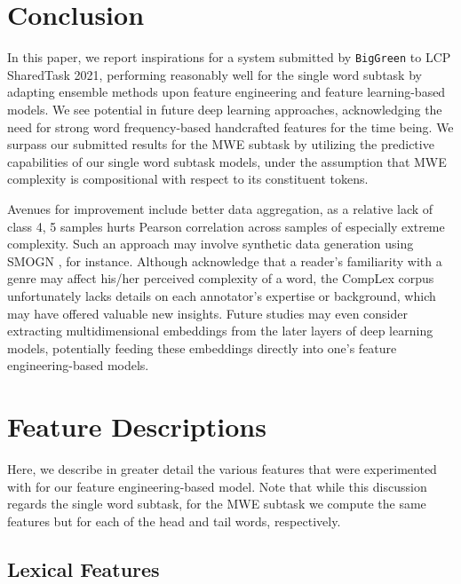 \documentclass{dcthesis}
\theoremstyle{definition}
\theoremstyle{remark}
\begin{document}
\chapter{Conclusion}

In this paper, we report inspirations for a system submitted by \texttt{BigGreen} to LCP SharedTask 2021, performing reasonably well for the single word subtask by adapting ensemble methods upon feature engineering and feature learning-based models. We see potential in future deep learning approaches, acknowledging the need for strong word frequency-based handcrafted features for the time being. We surpass our submitted results for the MWE subtask by utilizing the predictive capabilities of our single word subtask models, under the assumption that MWE complexity is compositional with respect to its constituent tokens.

Avenues for improvement include better data aggregation, as a relative lack of class 4, 5 samples hurts Pearson correlation across samples of especially extreme complexity. Such an approach may involve synthetic data generation using SMOGN \citep{branco2017smogn}, for instance. Although \citet{shardlow2020complex} acknowledge that a reader's familiarity with a genre may affect his/her perceived complexity of a word, the CompLex corpus unfortunately lacks details on each annotator's expertise or background, which may have offered valuable new insights. Future studies may even consider extracting multidimensional embeddings from the later layers of deep learning models, potentially feeding these embeddings directly into one's feature engineering-based models.

\appendix

\chapter{Feature Descriptions}
\label{appendix:descriptions}

Here, we describe in greater detail the various features that were experimented with for our feature engineering-based model. Note that while this discussion regards the single word subtask, for the MWE subtask we compute the same features but for each of the head and tail words, respectively.

\section{Lexical Features}
\end{document}
